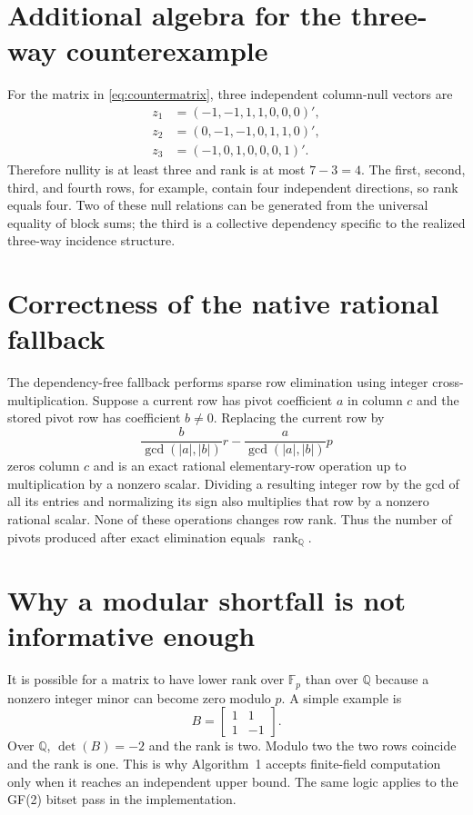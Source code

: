 \documentclass[11pt]{article}
\theoremstyle{definition}
\newcommand{\Q}{\mathbb{Q}}
\newcommand{\F}{\mathbb{F}}
\newcommand{\rank}{\operatorname{rank}}
\newcommand{\1}{\mathbf{1}}
\begin{document}
\appendix

\section{Additional algebra for the three-way counterexample}

For the matrix in \eqref{eq:countermatrix}, three independent column-null vectors are
\begin{align*}
 z_1 &= (-1,-1,1,1,0,0,0)',\\
 z_2 &= (0,-1,-1,0,1,1,0)',\\
 z_3 &= (-1,0,1,0,0,0,1)'.
\end{align*}
Therefore nullity is at least three and rank is at most $7-3=4$. The first, second, third, and fourth rows, for example, contain four independent directions, so rank equals four. Two of these null relations can be generated from the universal equality of block sums; the third is a collective dependency specific to the realized three-way incidence structure.

\section{Correctness of the native rational fallback}

The dependency-free fallback performs sparse row elimination using integer cross-multiplication. Suppose a current row has pivot coefficient $a$ in column $c$ and the stored pivot row has coefficient $b\neq0$. Replacing the current row by
\begin{equation}
  \frac{b}{\gcd(|a|,|b|)}r
  -\frac{a}{\gcd(|a|,|b|)}p
\end{equation}
zeros column $c$ and is an exact rational elementary-row operation up to multiplication by a nonzero scalar. Dividing a resulting integer row by the gcd of all its entries and normalizing its sign also multiplies that row by a nonzero rational scalar. None of these operations changes row rank. Thus the number of pivots produced after exact elimination equals $\rank_{\Q}$.

\section{Why a modular shortfall is not informative enough}

It is possible for a matrix to have lower rank over $\F_p$ than over $\Q$ because a nonzero integer minor can become zero modulo $p$. A simple example is
\begin{equation*}
  B=\begin{bmatrix}1&1\\1&-1\end{bmatrix}.
\end{equation*}
Over $\Q$, $\det(B)=-2$ and the rank is two. Modulo two the two rows coincide and the rank is one. This is why Algorithm~1 accepts finite-field computation only when it reaches an independent upper bound. The same logic applies to the GF(2) bitset pass in the implementation.
\end{document}
